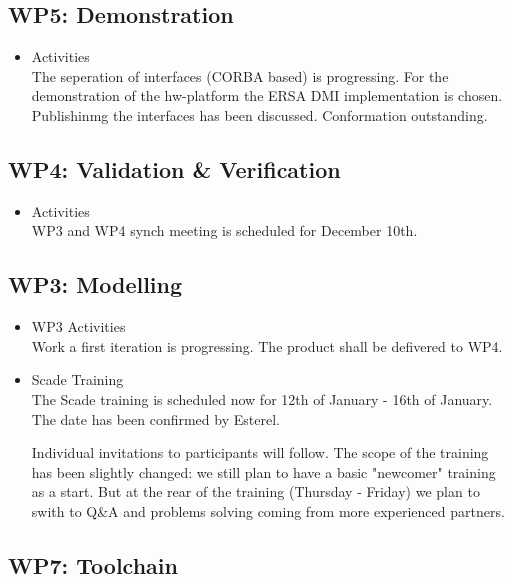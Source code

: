 \documentclass[a4paper, 11pt]{article}
\begin{document}
\subsection{WP5: Demonstration}
\begin{itemize}
\item Activities\\
The seperation of interfaces (CORBA based) is progressing. 
For the demonstration of the hw-platform the ERSA DMI implementation is chosen. Publishinmg the interfaces has been discussed. Conformation outstanding.

\end{itemize}

\subsection{WP4: Validation \& Verification}
\begin{itemize}
\item Activities\\
WP3 and WP4 synch meeting is scheduled for December 10th. 
\end{itemize}

\subsection{WP3: Modelling}
\begin{itemize}

\item WP3 Activities\\
Work a first iteration is progressing. The product shall be defivered to WP4. 

\item Scade Training\\
The Scade training is scheduled now for 12th of January - 16th of January.
The date has been confirmed by Esterel.

Individual invitations to participants will follow. The scope of the training has been slightly changed: we still plan to have a basic "newcomer" training as a start. But at the rear of the training (Thursday - Friday) we plan to swith to Q\&A and problems solving coming from more experienced partners.

\end{itemize}

\subsection{WP7: Toolchain}
\end{document}
